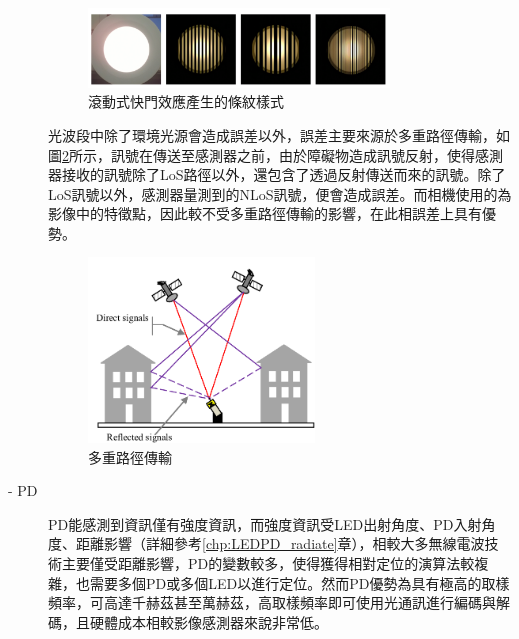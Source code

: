 \begin{description}
                    \begin{figure}[h]
                        \centering
                        \includegraphics[width=8cm]{ch2pic/rolling_shutter_case.png}
                        \caption{滾動式快門效應產生的條紋樣式\cite{pic:rolling_shutter_case}}
                        \label{pic:rolling_shutter_case}
                    \end{figure}

                    \qquad
                    光波段中除了環境光源會造成誤差以外，誤差主要來源於多重路徑傳輸，如圖\ref{pic:multipath}所示，訊號在傳送至感測器之前，由於障礙物造成訊號反射，使得感測器接收的訊號除了LoS路徑以外，還包含了透過反射傳送而來的訊號。除了LoS訊號以外，感測器量測到的NLoS訊號，便會造成誤差。而相機使用的為影像中的特徵點，因此較不受多重路徑傳輸的影響，在此相誤差上具有優勢。

                    \begin{figure}[h]
                        \centering
                        \includegraphics[width=6cm]{ch2pic/multipath.png}
                        \caption{多重路徑傳輸\cite{pic:multipath}}
                        \label{pic:multipath}
                    \end{figure}

                    \item[- PD]\hfill
                    
                    \qquad
                    PD能感測到資訊僅有強度資訊，而強度資訊受LED出射角度、PD入射角度、距離影響（詳細參考\ref{chp:LEDPD_radiate}章），相較大多無線電波技術主要僅受距離影響，PD的變數較多，使得獲得相對定位的演算法較複雜，也需要多個PD或多個LED以進行定位。然而PD優勢為具有極高的取樣頻率，可高達千赫茲甚至萬赫茲，高取樣頻率即可使用光通訊進行編碼與解碼，且硬體成本相較影像感測器來說非常低。


\end{description}
